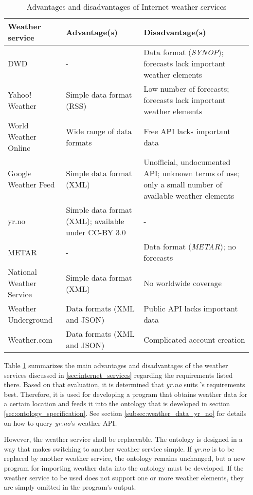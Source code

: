 \begin{table}
  \begin{tabularx}{\textwidth}{|X|X|X|}
  \hline
  \textbf{Weather service} & \textbf{Advantage(s)} & \textbf{Disadvantage(s)} \\
  \hline \hline
  DWD & - & Data format (\emph{SYNOP}); forecasts lack important weather elements \\
  \hline
  Yahoo! Weather & Simple data format (RSS) & Low number of forecasts; forecasts lack important weather elements \\
  \hline
  World Weather Online & Wide range of data formats & Free API lacks important data \\
  \hline
  Google Weather Feed & Simple data format (XML) & Unofficial, undocumented API; unknown terms of use; only a small number of available weather elements \\
  \hline
  yr.no & Simple data format (XML); available under CC-BY 3.0 & - \\
  \hline
  METAR & - & Data format (\emph{METAR}); no forecasts \\
  \hline
  National Weather Service & Simple data format (XML) & No worldwide coverage \\
  \hline
  Weather Underground & Data formats (XML and JSON) & Public API lacks important data \\
  \hline
  Weather.com & Data formats (XML and JSON) & Complicated account creation \\
  \hline
  \end{tabularx}
  \caption{Advantages and disadvantages of Internet weather services}
  \label{table:weather_services}
\end{table}

Table \ref{table:weather_services} summarizes the main advantages and disadvantages of the weather services discussed in \ref{sec:internet_services} regarding the requirements listed there. Based on that evaluation, it is determined that \emph{yr.no} suits \thinkhome's requirements best. Therefore, it is used for developing a program that obtains weather data for a certain location and feeds it into the \thinkhomeweather ontology that is developed in section \ref{sec:ontology_specification}. See section \ref{subsec:weather_data_yr_no} for details on how to query \emph{yr.no}'s weather API.

However, the weather service shall be replaceable. The ontology is designed in a way that makes switching to another weather service simple. If \emph{yr.no} is to be replaced by another weather service, the ontology remains unchanged, but a new program for importing weather data into the ontology must be developed. If the weather service to be used does not support one or more weather elements, they are simply omitted in the program's output.


